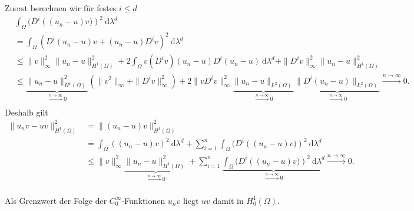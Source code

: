\begin{solution}
\begin{itemize}
Zuerst berechnen wir für festes $i \leq d$
\begin{align*}
    &\int_\Omega (D^i\left((u_n-u) v)\right)^2 \mathrm{~d}\lambda^d\\
    &= \int_{\Omega} (D^i(u_n-u)v + (u_n-u)D^iv)^2 \mathrm{~d}\lambda^d\\
    &\leq \|v\|^2_\infty \|u_n - u\|^2_{H^1(\Omega)} + 2 \int_{\Omega} v (D^iv) (u_n-u) D^i(u_n - u) \mathrm{~d}\lambda^d + \|D^iv\|^2_\infty \|u_n - u\|^2_{H^1(\Omega)}\\
    &\leq \underbrace{\|u_n - u\|^2_{H^1(\Omega)}}_{\xrightarrow[]{n \rightarrow \infty}{} 0} \left(\|v^2\|_\infty + \|D^iv\|^2_\infty\right) + 2\|vD^iv\|^2_\infty \underbrace{\|u_n-u\|_{L^2(\Omega)}}_{\xrightarrow[]{n \rightarrow \infty}{} 0} \underbrace{\|D^i(u_n-u)\|_{L^2(\Omega)}}_{\xrightarrow[]{n \rightarrow \infty}{} 0} \xrightarrow[]{n \rightarrow \infty}{} 0.
\end{align*}
Deshalb gilt
\begin{align*}
    \| u_n v - uv \|^2_{H^1(\Omega)}
    &= \| (u_n-u) v\|^2_{H^1(\Omega)}\\
    &= \int_\Omega((u_n-u) v)^2 \mathrm{~d}\lambda^d
    + \sum_{i = 1}^n \int_\Omega (D^i\left((u_n-u) v)\right)^2 \mathrm{~d}\lambda^d\\
    &\leq \|v\|^2_\infty \underbrace{\|u_n - u\|^2_{H^1(\Omega)}}_{\xrightarrow[]{n \rightarrow \infty}{} 0} + \sum_{i = 1}^n \underbrace{\int_{\Omega} (D^i\left((u_n-u) v)\right)^2 \mathrm{~d}\lambda^d}_{\xrightarrow[]{n \rightarrow \infty}{} 0} \xrightarrow[]{n \rightarrow \infty}{} 0.
\end{align*}

Als Grenzwert der Folge der $C_0^\infty$-Funktionen $u_n v$ liegt $uv$ damit in $H_0^1(\Omega).$
\end{itemize}

\end{solution}

